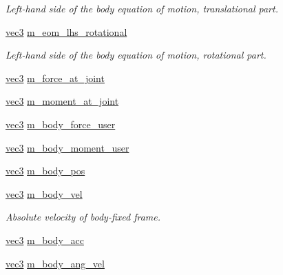 \begin{CompactItemize}
\begin{CompactList}\small\item\em Left-hand side of the body equation of motion, translational part. \item\end{CompactList}\item 
\hypertarget{structbt_inverse_dynamics_1_1_rigid_body_e9529f5eab0aada265b62815c12dcaaf}{
\hyperlink{classbt_inverse_dynamics_1_1vec3}{vec3} \hyperlink{structbt_inverse_dynamics_1_1_rigid_body_e9529f5eab0aada265b62815c12dcaaf}{m\_\-eom\_\-lhs\_\-rotational}}
\label{structbt_inverse_dynamics_1_1_rigid_body_e9529f5eab0aada265b62815c12dcaaf}

\begin{CompactList}\small\item\em Left-hand side of the body equation of motion, rotational part. \item\end{CompactList}\item 
\hyperlink{classbt_inverse_dynamics_1_1vec3}{vec3} \hyperlink{structbt_inverse_dynamics_1_1_rigid_body_00b16b69c8a91774162c934ca8ec1e2c}{m\_\-force\_\-at\_\-joint}
\item 
\hyperlink{classbt_inverse_dynamics_1_1vec3}{vec3} \hyperlink{structbt_inverse_dynamics_1_1_rigid_body_e72019499bdedb8dc12131a48b3a243c}{m\_\-moment\_\-at\_\-joint}
\item 
\hyperlink{classbt_inverse_dynamics_1_1vec3}{vec3} \hyperlink{structbt_inverse_dynamics_1_1_rigid_body_c0d70c45cc5e1876fb7aba320293a7fb}{m\_\-body\_\-force\_\-user}
\item 
\hyperlink{classbt_inverse_dynamics_1_1vec3}{vec3} \hyperlink{structbt_inverse_dynamics_1_1_rigid_body_2525b72b49dff7c73e9d4056e6e13411}{m\_\-body\_\-moment\_\-user}
\item 
\hyperlink{classbt_inverse_dynamics_1_1vec3}{vec3} \hyperlink{structbt_inverse_dynamics_1_1_rigid_body_be1a189ee858529b691fe72beb819e5f}{m\_\-body\_\-pos}
\item 
\hypertarget{structbt_inverse_dynamics_1_1_rigid_body_72cf1e877fe50ff6d927001c35d9a002}{
\hyperlink{classbt_inverse_dynamics_1_1vec3}{vec3} \hyperlink{structbt_inverse_dynamics_1_1_rigid_body_72cf1e877fe50ff6d927001c35d9a002}{m\_\-body\_\-vel}}
\label{structbt_inverse_dynamics_1_1_rigid_body_72cf1e877fe50ff6d927001c35d9a002}

\begin{CompactList}\small\item\em Absolute velocity of body-fixed frame. \item\end{CompactList}\item 
\hyperlink{classbt_inverse_dynamics_1_1vec3}{vec3} \hyperlink{structbt_inverse_dynamics_1_1_rigid_body_67bb39b2dbbd0180395b251bdbae00c7}{m\_\-body\_\-acc}
\item 
\hypertarget{structbt_inverse_dynamics_1_1_rigid_body_4996f2d7851b6b69f77661a67cda7b59}{
\hyperlink{classbt_inverse_dynamics_1_1vec3}{vec3} \hyperlink{structbt_inverse_dynamics_1_1_rigid_body_4996f2d7851b6b69f77661a67cda7b59}{m\_\-body\_\-ang\_\-vel}}
\label{structbt_inverse_dynamics_1_1_rigid_body_4996f2d7851b6b69f77661a67cda7b59}


\end{CompactItemize}
